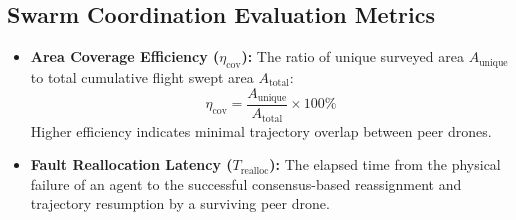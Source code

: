 \subsection{Swarm Coordination Evaluation Metrics}
\begin{itemize}
    \item \textbf{Area Coverage Efficiency ($\eta_{\text{cov}}$):} The ratio of unique surveyed area $A_{\text{unique}}$ to total cumulative flight swept area $A_{\text{total}}$:
    \begin{equation}
        \eta_{\text{cov}} = \frac{A_{\text{unique}}}{A_{\text{total}}} \times 100\%
    \end{equation}
    Higher efficiency indicates minimal trajectory overlap between peer drones.
    \item \textbf{Fault Reallocation Latency ($T_{\text{realloc}}$):} The elapsed time from the physical failure of an agent to the successful consensus-based reassignment and trajectory resumption by a surviving peer drone.
\end{itemize}
